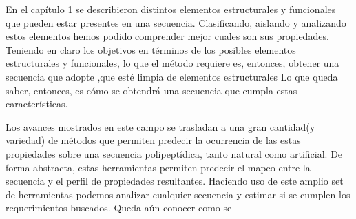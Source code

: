 En el capítulo 1 se describieron distintos elementos estructurales y funcionales que pueden estar presentes en una secuencia.
Clasificando, aislando y analizando estos elementos hemos podido comprender mejor cuales son sus propiedades. 
Teniendo en claro los objetivos en términos de los posibles elementos estructurales y funcionales, lo que el método requiere es, entonces, obtener una secuencia que adopte ,que esté limpia de elementos estructurales 
Lo que queda saber, entonces, es cómo se obtendrá una secuencia que cumpla estas características.




Los avances mostrados en este campo se trasladan a una gran cantidad(y variedad) de métodos que permiten predecir la ocurrencia de las estas propiedades sobre una secuencia polipeptídica, tanto natural como artificial.
De forma abstracta, estas herramientas permiten predecir el mapeo entre la secuencia y el perfil de propiedades resultantes. 
% 
Haciendo uso de este amplio set de herramientas podemos analizar cualquier secuencia y estimar si se cumplen los requerimientos buscados.
Queda aún conocer como se 




